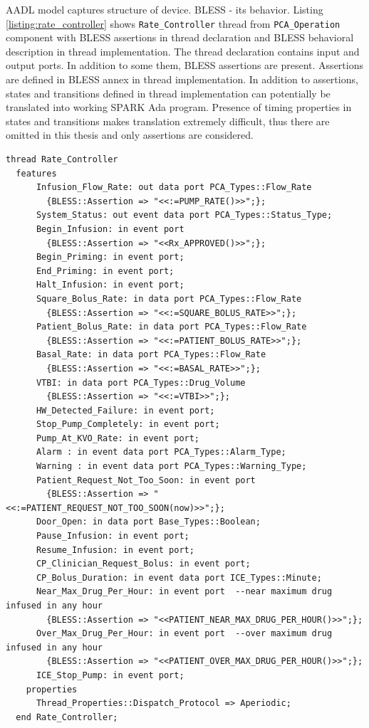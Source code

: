 AADL model captures structure of device. BLESS - its behavior. Listing \ref{listing:rate_controller} shows \lstinline{Rate_Controller} thread from \lstinline{PCA_Operation} component with BLESS assertions in thread declaration and BLESS behavioral description in thread implementation. The thread declaration contains input and output ports. In addition to some them, BLESS assertions are present. Assertions are defined in BLESS annex in thread implementation. In addition to assertions, states and transitions defined in thread implementation can potentially be translated into working SPARK Ada program. Presence of timing properties in states and transitions makes translation extremely difficult, thus there are omitted in this thesis and only assertions are considered.

\singlespacing
\begin{lstlisting}[language=aadl, frame=single, gobble=0, caption={\lstinline{Rate_Controller} thread from \lstinline{PCA_Operation} component with BLESS assertions}, label={listing:rate_controller}]
  thread Rate_Controller
  features
      Infusion_Flow_Rate: out data port PCA_Types::Flow_Rate
        {BLESS::Assertion => "<<:=PUMP_RATE()>>";};   
      System_Status: out event data port PCA_Types::Status_Type;
      Begin_Infusion: in event port
        {BLESS::Assertion => "<<Rx_APPROVED()>>";};  
      Begin_Priming: in event port;
      End_Priming: in event port;
      Halt_Infusion: in event port;
      Square_Bolus_Rate: in data port PCA_Types::Flow_Rate 
        {BLESS::Assertion => "<<:=SQUARE_BOLUS_RATE>>";};
      Patient_Bolus_Rate: in data port PCA_Types::Flow_Rate 
        {BLESS::Assertion => "<<:=PATIENT_BOLUS_RATE>>";};
      Basal_Rate: in data port PCA_Types::Flow_Rate 
        {BLESS::Assertion => "<<:=BASAL_RATE>>";};
      VTBI: in data port PCA_Types::Drug_Volume 
        {BLESS::Assertion => "<<:=VTBI>>";};
      HW_Detected_Failure: in event port;
      Stop_Pump_Completely: in event port; 
      Pump_At_KVO_Rate: in event port; 
      Alarm : in event data port PCA_Types::Alarm_Type;
      Warning : in event data port PCA_Types::Warning_Type;
      Patient_Request_Not_Too_Soon: in event port 
        {BLESS::Assertion => "<<:=PATIENT_REQUEST_NOT_TOO_SOON(now)>>";};  
      Door_Open: in data port Base_Types::Boolean;
      Pause_Infusion: in event port;
      Resume_Infusion: in event port;
      CP_Clinician_Request_Bolus: in event port;
      CP_Bolus_Duration: in event data port ICE_Types::Minute; 
      Near_Max_Drug_Per_Hour: in event port  --near maximum drug infused in any hour
        {BLESS::Assertion => "<<PATIENT_NEAR_MAX_DRUG_PER_HOUR()>>";};  
      Over_Max_Drug_Per_Hour: in event port  --over maximum drug infused in any hour
        {BLESS::Assertion => "<<PATIENT_OVER_MAX_DRUG_PER_HOUR()>>";};  
      ICE_Stop_Pump: in event port;
    properties
      Thread_Properties::Dispatch_Protocol => Aperiodic;
  end Rate_Controller;


\end{lstlisting}
